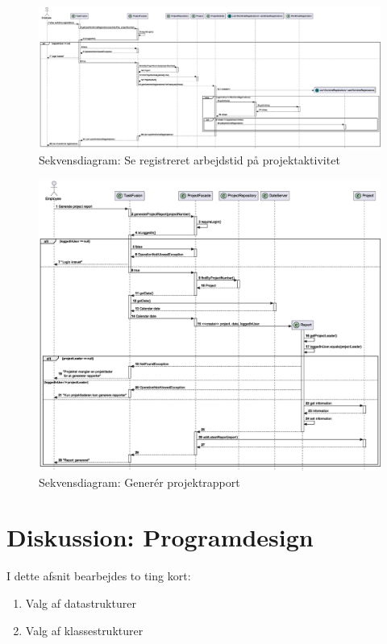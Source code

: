 \begin{figure}[H]
    \centering
    \caption{Sekvensdiagram: Se registreret arbejdstid på projektaktivitet}\label{fig:sequenceViewWorktime}
    \includegraphics[width=\textwidth]{RequirementsAndDesign/SequenceDiagrams/seqViewWorktime.eps}
\end{figure}
\begin{figure}[H]
    \centering
    \caption{Sekvensdiagram: Generér projektrapport}\label{fig:sequenceGenerateProjectReport}
    \includegraphics[width=\textwidth]{RequirementsAndDesign/SequenceDiagrams/seqGenerateProjectReport.eps}
\end{figure}
\section{Diskussion: Programdesign}
I dette afsnit bearbejdes to ting kort:
\begin{enumerate}
    \item Valg af datastrukturer
    \item Valg af klassestrukturer
\end{enumerate}
